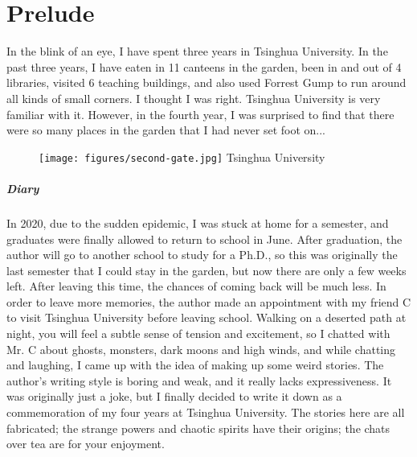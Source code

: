 \chapter{Prelude}

In the blink of an eye, I have spent three years in Tsinghua University.  In
the past three years, I have eaten in 11 canteens in the garden, been in and
out of 4 libraries, visited 6 teaching buildings, and also used Forrest Gump to
run around all kinds of small corners. I thought I was right. Tsinghua
University is very familiar with it.  However, in the fourth year, I was
surprised to find that there were so many places in the garden that I had never
set foot on...

\vfill

\begin{figure}[h]
	\centering
	\texttt{[image: figures/second-gate.jpg]}
	Tsinghua University
\end{figure}

\paragraph{Diary} In 2020, due to the sudden epidemic, I was stuck at home for
a semester, and graduates were finally allowed to return to school in June.
After graduation, the author will go to another school to study for a Ph.D., so
this was originally the last semester that I could stay in the garden, but now
there are only a few weeks left.  After leaving this time, the chances of
coming back will be much less. In order to leave more memories, the author made
an appointment with my friend C to visit Tsinghua University before leaving
school.  Walking on a deserted path at night, you will feel a subtle sense of
tension and excitement, so I chatted with Mr. C about ghosts, monsters, dark
moons and high winds, and while chatting and laughing, I came up with the idea
of making up some weird stories.  The author's writing style is boring and
weak, and it really lacks expressiveness. It was originally just a joke, but I
finally decided to write it down as a commemoration of my four years at
Tsinghua University.  The stories here are all fabricated; the strange powers
and chaotic spirits have their origins; the chats over tea are for your
enjoyment.
